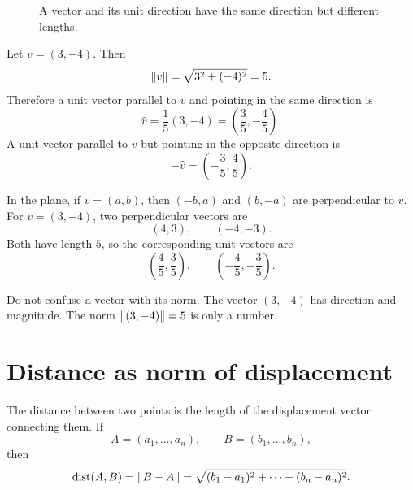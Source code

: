 \begin{figure}[H]
\centering
{}
\caption{A vector and its unit direction have the same direction but different lengths.}
\end{figure}

\begin{examplebox}[title={Example 3.3: Unit vector parallel to $(3,-4)$}]
Let $v=(3,-4)$. Then
\[
  \left\lVert v\right\rVert=\sqrt{3^2+(-4)^2}=5.
\]
Therefore a unit vector parallel to $v$ and pointing in the same direction is
\[
  \widehat v=\frac{1}{5}(3,-4)=\left(\frac35,-\frac45\right).
\]
A unit vector parallel to $v$ but pointing in the opposite direction is
\[
  -\widehat v=\left(-\frac35,\frac45\right).
\]
\end{examplebox}

\begin{examplebox}[title={Example 3.4: Unit vectors perpendicular to $(3,-4)$}]
In the plane, if $v=(a,b)$, then $(-b,a)$ and $(b,-a)$ are perpendicular to $v$. For $v=(3,-4)$, two perpendicular vectors are
\[
  (4,3), \qquad (-4,-3).
\]
Both have length $5$, so the corresponding unit vectors are
\[
  \left(\frac45,\frac35\right), \qquad
  \left(-\frac45,-\frac35\right).
\]
\end{examplebox}

\begin{warningbox}
Do not confuse a vector with its norm. The vector $(3,-4)$ has direction and magnitude. The norm $\left\lVert (3,-4)\right\rVert=5$ is only a number.
\end{warningbox}

\section{Distance as norm of displacement}

The distance between two points is the length of the displacement vector connecting them. If
\[
  A=(a_1,\ldots,a_n), \qquad B=(b_1,\ldots,b_n),
\]
then
\[
  \operatorname{dist}(A,B)=\left\lVert B-A\right\rVert=\sqrt{(b_1-a_1)^2+\cdots+(b_n-a_n)^2}.
\]

